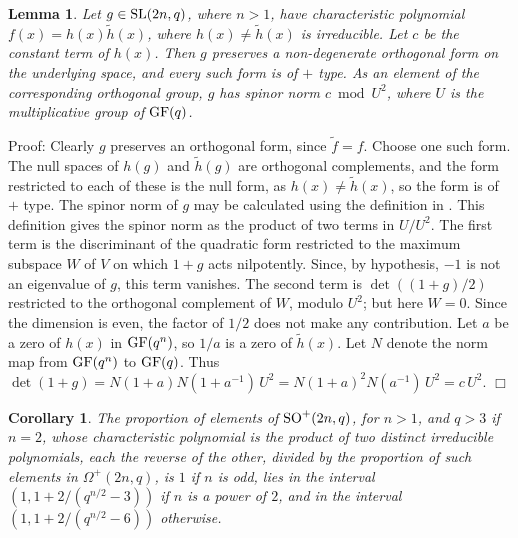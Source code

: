 \documentclass[12pt]{article}
\newtheorem{lemma}[definition]{Lemma}
\newtheorem{corollary}[definition]{Corollary}
\newenvironment{proof}{\normalsize {\sc Proof}:}{{\hfill $\Box$ \\}}
\def\SL{{\rm SL}}
\def\SO{{\rm SO}}
\def\GF{{\rm GF}}
\begin{document}
\begin{lemma}\label{spinor-norm}
Let $g\in\SL(2n,q)$, where $n>1$, have characteristic polynomial 
$f(x)=h(x)\tilde{h}(x)$, where $h(x)\ne\tilde{h}(x)$ is
irreducible.  Let $c$ be the constant term of $h(x)$.
Then $g$ preserves a non-degenerate orthogonal form on the 
underlying space, and every such form
is of $+$ type. 
As an element of the corresponding orthogonal group, 
$g$ has spinor norm $c\bmod U^2$, where
$U$ is the multiplicative group of $\GF(q)$.
\end{lemma}
\begin{proof}
Clearly $g$ preserves an orthogonal form, since $\tilde{f}=f$.  
Choose one such form.
The null spaces of $h(g)$ and $\tilde{h}(g)$ are orthogonal complements, 
and the form restricted
to each of these is the null form, 
as $h(x)\ne\tilde{h}(x)$, so the form is of $+$ type.
The spinor norm of $g$ may be calculated using the 
definition in \cite[p.\ 444]{Zassenhaus}.
This definition gives the spinor norm as the product of two 
terms in $U/U^2$.
The first term is the discriminant of the quadratic form restricted 
to the maximum subspace 
$W$ of $V$ on which $1+g$ acts nilpotently.  Since, by hypothesis,
$-1$ is not an eigenvalue of $g$, this term vanishes.  
The second term is $\det((1+g)/2)$ restricted to the
orthogonal complement of $W$, modulo $U^2$; but here $W=0$.  
Since the dimension is even, the factor of $1/2$ does not
make any contribution.  Let $a$ be a zero of $h(x)$ in $\GF(q^n)$, 
so $1/a$ is a zero of $\tilde{h}(x)$.
Let $N$ denote the norm map from $\GF(q^n)$ to $\GF(q)$.  Thus 
$\det(1+g)=N(1+a)N(1+a^{-1})\,U^2=N(1+a)^2N(a^{-1})\,U^2 =c\,U^2$.
\end{proof}
\begin{corollary}\label{Comp}
The proportion of elements of $\SO^+(2n,q)$, 
for $n>1$, and $q>3$ if $n=2$, whose 
characteristic polynomial is the product of two distinct irreducible 
polynomials,
each the reverse of the other, divided by the proportion of 
such elements in $\Omega^+(2n,q)$, is $1$ if $n$ is odd, 
lies in the interval $(1, 1+2/(q^{n/2}-3))$ if $n$ is a power of $2$,
and in the interval $(1, 1+2/(q^{n/2}-6))$ otherwise.
\end{corollary}
\end{document}

